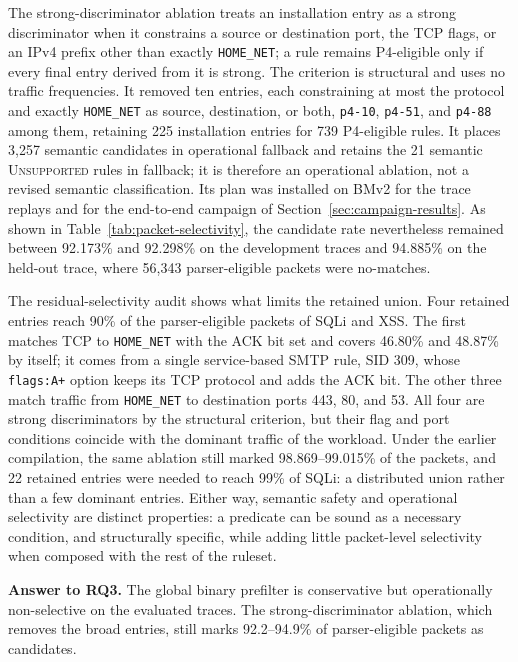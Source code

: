 \documentclass{article}
\begin{document}
The strong-discriminator ablation treats an installation entry as a strong
discriminator when it constrains a source or destination port, the TCP
flags, or an IPv4 prefix other than exactly \texttt{HOME\_NET}; a rule
remains P4-eligible only if every final entry derived from it is strong. The
criterion is structural and uses no traffic frequencies. It removed ten
entries, each constraining at most the protocol and exactly
\texttt{HOME\_NET} as source, destination, or both, \texttt{p4-10},
\texttt{p4-51}, and \texttt{p4-88} among them, retaining 225 installation
entries for 739 P4-eligible rules. It places 3,257 semantic candidates in
operational fallback and retains the 21 semantic \textsc{Unsupported} rules
in fallback; it is therefore an operational ablation, not a revised semantic
classification. Its plan was installed on BMv2 for the trace replays and for
the end-to-end campaign of Section~\ref{sec:campaign-results}. As shown in
Table~\ref{tab:packet-selectivity}, the candidate rate nevertheless remained
between 92.173\% and 92.298\% on the development traces and 94.885\% on the
held-out trace, where 56,343 parser-eligible packets were no-matches.

The residual-selectivity audit shows what limits the retained union. Four
retained entries reach 90\% of the parser-eligible packets of SQLi and XSS.
The first matches TCP to \texttt{HOME\_NET} with the ACK bit set and covers
46.80\% and 48.87\% by itself; it comes from a single service-based SMTP
rule, SID 309, whose \texttt{flags:A+} option keeps its TCP protocol and
adds the ACK bit. The other three match traffic from \texttt{HOME\_NET} to
destination ports 443, 80, and 53. All four are strong discriminators by the
structural criterion, but their flag and port conditions coincide with the
dominant traffic of the workload. Under the earlier compilation, the same
ablation still marked 98.869--99.015\% of the packets, and 22 retained
entries were needed to reach 99\% of SQLi: a distributed union rather than a
few dominant entries. Either way, semantic safety and operational
selectivity are distinct properties: a predicate can be sound as a necessary
condition, and structurally specific, while adding little packet-level
selectivity when composed with the rest of the ruleset.

\noindent\textbf{Answer to RQ3.} The global binary prefilter is conservative
but operationally non-selective on the evaluated traces. The
strong-discriminator ablation, which removes the broad entries, still marks
92.2--94.9\% of parser-eligible packets as candidates.
\end{document}
